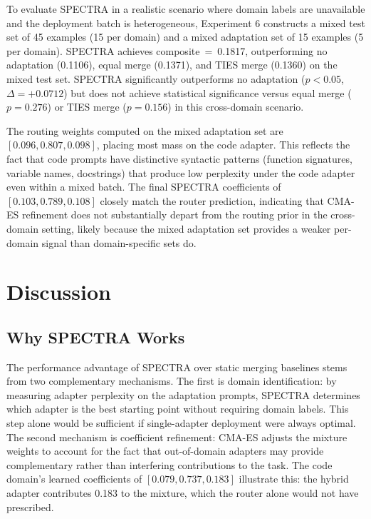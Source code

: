 \documentclass[preprint,12pt]{elsarticle}
\begin{document}
To evaluate SPECTRA in a realistic scenario where domain labels are unavailable
and the deployment batch is heterogeneous, Experiment 6 constructs a mixed test
set of 45 examples (15 per domain) and a mixed adaptation set of 15 examples
(5 per domain). SPECTRA achieves composite~=~0.1817, outperforming no
adaptation (0.1106), equal merge (0.1371), and TIES merge (0.1360) on the
mixed test set. SPECTRA significantly outperforms no adaptation ($p < 0.05$,
$\Delta = +0.0712$) but does not achieve statistical significance versus equal
merge ($p = 0.276$) or TIES merge ($p = 0.156$) in this cross-domain scenario.

The routing weights computed on the mixed adaptation set are
$[0.096, 0.807, 0.098]$, placing most mass on the code adapter. This reflects
the fact that code prompts have distinctive syntactic patterns (function
signatures, variable names, docstrings) that produce low perplexity under the
code adapter even within a mixed batch. The final SPECTRA coefficients of
$[0.103, 0.789, 0.108]$ closely match the router prediction, indicating that
CMA-ES refinement does not substantially depart from the routing prior in the
cross-domain setting, likely because the mixed adaptation set provides a
weaker per-domain signal than domain-specific sets do.

\section{Discussion}
\label{sec:discussion}

\subsection{Why SPECTRA Works}

The performance advantage of SPECTRA over static merging baselines stems from
two complementary mechanisms. The first is domain identification: by measuring
adapter perplexity on the adaptation prompts, SPECTRA determines which adapter
is the best starting point without requiring domain labels. This step alone
would be sufficient if single-adapter deployment were always optimal. The
second mechanism is coefficient refinement: CMA-ES adjusts the mixture weights
to account for the fact that out-of-domain adapters may provide complementary
rather than interfering contributions to the task. The code domain's learned
coefficients of $[0.079, 0.737, 0.183]$ illustrate this: the hybrid adapter
contributes 0.183 to the mixture, which the router alone would not have
prescribed.
\end{document}
